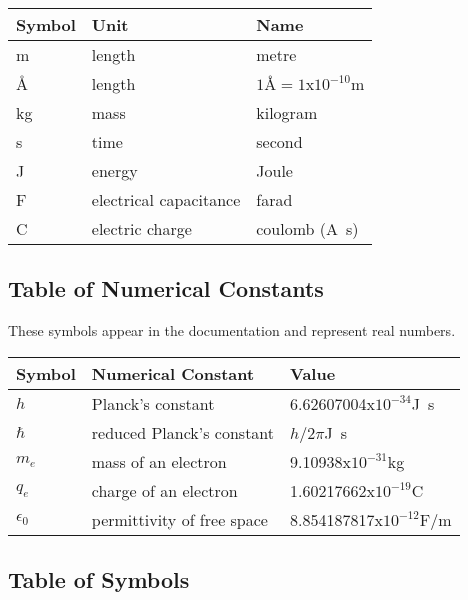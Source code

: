 \documentclass[12pt]{article}
\begin{document}
\renewcommand{\arraystretch}{1.2}
  \noindent \begin{tabular}{l l l} 
    \toprule		
    \textbf{Symbol} & \textbf{Unit} & \textbf{Name}\\
    \midrule 
    \si{\metre} & length & metre\\
    \si{\angstrom} & length & $1\si{\angstrom} = 1$x$10^{-10}$\si{\metre} \\
    \si{\kilogram} & mass	& kilogram\\
    \si{\second} & time & second\\
    \si{\joule} & energy & Joule\\
    \si{\farad} & electrical capacitance & farad \\
    \si{\coulomb} & electric charge & coulomb (\si{\ampere\second}) \\
    \bottomrule
  \end{tabular}

\subsection{Table of Numerical Constants}

These symbols appear in the documentation and represent real numbers.

\renewcommand{\arraystretch}{1.2}
\noindent \begin{longtable*}{l l p{12cm}} \toprule
	\textbf{Symbol} & \textbf{Numerical Constant} & \textbf{Value}\\
	\midrule 
	$h$ & Planck's constant & 6.62607004x$10^{-34}$\si{\joule\second} \\
	$\hbar$ & reduced Planck's constant & $h/2\pi$\si{\joule\second} \\
	$m_e$ & mass of an electron & 9.10938x$10^{-31}$\si{\kilogram} \\
	$q_e$ & charge of an electron & 1.60217662x$10^{-19}$\si{\coulomb} \\
	$\epsilon_0$ & permittivity of free space  & 8.854187817x$10^{−12} 
	\si{\farad/\metre}$ \\

	\bottomrule
\end{longtable*}

\subsection{Table of Symbols}
\end{document}
